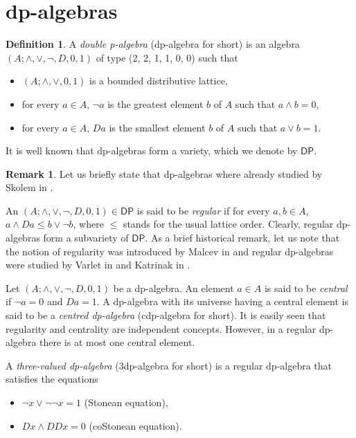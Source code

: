 \documentclass[a4paper,11pt]{article}
\theoremstyle{definition}
\newtheorem{defn}[theorem]{Definition}
\newtheorem{rem}[theorem]{Remark}
\newcommand{\dpa}{\mathsf{DP}}
\begin{document}
\section{dp-algebras} \label{DPA}

\begin{defn}
A \emph{double p-algebra} (dp-algebra for short) is an algebra $(A; \wedge, \vee, \neg, D, 0, 1)$ of type (2, 2, 1, 1, 0, 0)  such that
	\begin{itemize}
		\item[]$(A; \wedge, \vee, 0, 1)$ is a bounded distributive lattice,
		\item[]for every $a \in A$, $\neg a$ is the greatest element $b$ of $A$ such that $a \wedge b = 0$, 
		\item[]for every $a \in A$, $D a$ is the smallest element $b$ of $A$ such that $a \vee b = 1$.
	\end{itemize}
\end{defn}

It is well known that dp-algebras form a variety, which we denote by $\dpa$.

\begin{rem} 
Let us briefly state that dp-algebras where already studied by Skolem in \cite[\S 2]{TS}.
\end{rem}

An $(A; \wedge, \vee, \neg, D, 0, 1) \in \dpa$ is said to be \emph{regular} if for every $a, b \in A$, $a \wedge Da \leq b \vee \neg b$, where $\leq$ stands for the usual lattice order. 
Clearly, regular dp-algebras form a subvariety of $\dpa$. 
As a brief historical remark, let us note that the notion of regularity was introduced by Malcev in \cite{AM} and regular dp-algebras were studied by Varlet in \cite{V1972} and Katrinak in \cite{TK}. 

Let $(A; \wedge, \vee, \neg, D, 0, 1)$ be a dp-algebra. 
An element $a \in A$ is said to be \emph{central} if $\neg a = 0$ and $Da = 1$. 
A dp-algebra with its universe having a central element is said to be a \emph{centred dp-algebra} (cdp-algebra for short).
It is easily seen that regularity and centrality are independent concepts.
However, in a regular dp-algebra there is at most one central element. 

A \emph{three-valued dp-algebra} (3dp-algebra for short) is a regular dp-algebra that satisfies the equations
\begin{itemize}
	\item[(S)] $\neg x \vee \neg\neg x = 1$ (Stonean equation), 
	\item[(cS)] $D x \wedge D D x = 0$ (coStonean equation).
\end{itemize}
\end{document}
